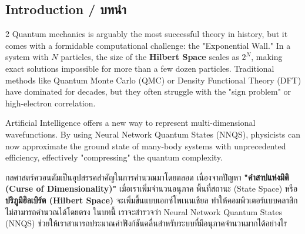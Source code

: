 \subsection{Introduction \quad / \quad \textthai{บทนำ}}
\begin{paracol}{2}
Quantum mechanics is arguably the most successful theory in history, but it comes with a formidable computational challenge: the "Exponential Wall." In a system with $N$ particles, the size of the \textbf{Hilbert Space} scales as $2^N$, making exact solutions impossible for more than a few dozen particles. Traditional methods like Quantum Monte Carlo (QMC) or Density Functional Theory (DFT) have dominated for decades, but they often struggle with the "sign problem" or high-electron correlation.

Artificial Intelligence offers a new way to represent multi-dimensional wavefunctions. By using Neural Network Quantum States (NNQS), physicists can now approximate the ground state of many-body systems with unprecedented efficiency, effectively "compressing" the quantum complexity.

\switchcolumn

\begin{thai}
กลศาสตร์ควอนตัมเป็นอุปสรรคสำคัญในการคำนวณมาโดยตลอด เนื่องจากปัญหา \textbf{"คำสาปแห่งมิติ (Curse of Dimensionality)"} เมื่อเราเพิ่มจำนวนอนุภาค พื้นที่สถานะ (State Space) หรือ\textbf{ปริภูมิฮิลเบิร์ต (Hilbert Space)} จะเพิ่มขึ้นแบบเอกซ์โพเนนเชียล ทำให้คอมพิวเตอร์แบบคลาสิกไม่สามารถคำนวณได้โดยตรง ในบทนี้ เราจะสำรวจว่า Neural Network Quantum States (NNQS) ช่วยให้เราสามารถประมาณค่าฟังก์ชันคลื่นสำหรับระบบที่มีอนุภาคจำนวนมากได้อย่างไร
\end{thai}
\end{paracol}
